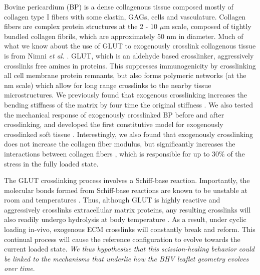 	Bovine pericardium (BP) is a dense collagenous tissue composed mostly of collagen type I fibers with some elastin, GAGs, cells and vasculature. Collagen fibers are complex protein structures at the 2 - 10 $\mu$m scale, composed of tightly bundled collagen fibrils, which are approximately 50 nm in diameter. Much of what we know about the use of GLUT to exogenously crosslink collagenous tissue is from Nimni \textit{et al.} \cite{cheung_mechanism_1990, nimni_chemically_1987, cheung_mechanism_1985, gendler_toxic_1984, cheung_presence_1983, cheung_mechanism_1982, cheung_mechanism_1982II}. GLUT, which is an aldehyde based crosslinker, aggressively crosslinks free amines in proteins. This suppresses immunogenicity by crosslinking all cell membrane protein remnants, but also forms polymeric networks (at the nm scale) which allow for long range crosslinks to the nearby tissue microstructures. We previously found that exogenous crosslinking increases the bending stiffness of the matrix by four time the original stiffness \cite{mirnajafi_effects_2010}. We also tested the mechanical response of exogenously crosslinked BP before and after crosslinking, and developed the first constitutive model for exogenously crosslinked soft tissue \cite{sacks_novel_2016}. Interestingly, we also found that exogenously crosslinking does not increase the collagen fiber modulus, but significantly increases the interactions between collagen fibers \cite{sacks_novel_2016}, which is responsible for up to 30\% of the stress in the fully loaded state. 


	The GLUT crosslinking process involves a Schiff-base reaction. Importantly, the molecular bonds formed from Schiff-base reactions are known to be unstable at room and temperatures \cite{migneault_glutaraldehyde_2004, damink_glutaraldehyde_1995}. Thus, although GLUT is highly reactive and aggressively crosslinks extracellular matrix proteins, any resulting crosslinks will also readily undergo hydrolysis at body temperature \cite{migneault_glutaraldehyde_2004}. As a result, under cyclic loading in-vivo, exogenous ECM crosslinks will constantly break and reform. This continual process will cause the reference configuration to evolve towards the current loaded state. \emph{We thus hypothesize that this scission-healing behavior could be linked to the mechanisms that underlie how the BHV leaflet geometry evolves over time}.
	
